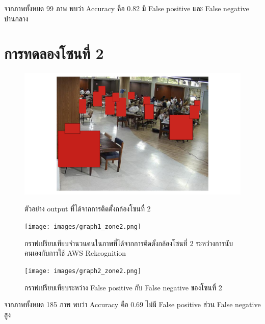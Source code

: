 จากภาพทั้งหมด 99 ภาพ พบว่า Accuracy คือ 0.82 มี False positive และ False negative ปานกลาง

\newpage
\section{การทดลองโซนที่ 2}
\begin{figure}[ht]
    \centering
    \includegraphics[width=\textwidth]{images/modified_Picture (102).png}
    \caption[ตัวอย่าง output ที่ได้จากการติดตั้งกล้องโซนที่ 2]{ตัวอย่าง output ที่ได้จากการติดตั้งกล้องโซนที่ 2}
    \label{fig:output2}
    \centering
    \texttt{[image: images/graph1\_zone2.png]}
    \caption[กราฟเปรียบเทียบจำนวนคนในภาพที่ได้จากการติดตั้งกล้องโซนที่ 2 ระหว่างการนับคนเองกับการใช้ AWS Rekcognition]{กราฟเปรียบเทียบจำนวนคนในภาพที่ได้จากการติดตั้งกล้องโซนที่ 2 ระหว่างการนับคนเองกับการใช้ AWS Rekcognition}
    \label{fig:graph1-2}
\end{figure}
\newpage
\begin{figure}[ht]
    \centering
    \texttt{[image: images/graph2\_zone2.png]}
    \caption[กราฟเปรียบเทียบระหว่าง False positive กับ False negative ของโซนที่ 2]{กราฟเปรียบเทียบระหว่าง False positive กับ False negative ของโซนที่ 2}
    \label{fig:graph2-2}
\end{figure}
จากภาพทั้งหมด 185 ภาพ พบว่า Accuracy คือ 0.69 ไม่มี False positive ส่วน False negative สูง

\newpage
